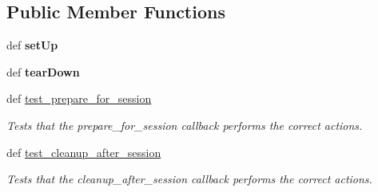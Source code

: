 \subsection*{Public Member Functions}
\begin{DoxyCompactItemize}
\item 
\hypertarget{classhwm_1_1hardware_1_1devices_1_1drivers_1_1mxl__balloon__tracker_1_1tests_1_1test__mxl__ballodf60623d41e11143100d8361dee24ac6_aff128f0ada139a591e12be5211de7720}{def {\bfseries set\-Up}}\label{classhwm_1_1hardware_1_1devices_1_1drivers_1_1mxl__balloon__tracker_1_1tests_1_1test__mxl__ballodf60623d41e11143100d8361dee24ac6_aff128f0ada139a591e12be5211de7720}

\item 
\hypertarget{classhwm_1_1hardware_1_1devices_1_1drivers_1_1mxl__balloon__tracker_1_1tests_1_1test__mxl__ballodf60623d41e11143100d8361dee24ac6_a63ef7ce99d7bfb0de2ec986b15038068}{def {\bfseries tear\-Down}}\label{classhwm_1_1hardware_1_1devices_1_1drivers_1_1mxl__balloon__tracker_1_1tests_1_1test__mxl__ballodf60623d41e11143100d8361dee24ac6_a63ef7ce99d7bfb0de2ec986b15038068}

\item 
def \hyperlink{classhwm_1_1hardware_1_1devices_1_1drivers_1_1mxl__balloon__tracker_1_1tests_1_1test__mxl__ballodf60623d41e11143100d8361dee24ac6_a5de3af07d10144409221add081907623}{test\-\_\-prepare\-\_\-for\-\_\-session}
\begin{DoxyCompactList}\small\item\em Tests that the prepare\-\_\-for\-\_\-session callback performs the correct actions. \end{DoxyCompactList}\item 
def \hyperlink{classhwm_1_1hardware_1_1devices_1_1drivers_1_1mxl__balloon__tracker_1_1tests_1_1test__mxl__ballodf60623d41e11143100d8361dee24ac6_a74753ed8b5e1cf0bf5e2e6150bb69ee0}{test\-\_\-cleanup\-\_\-after\-\_\-session}
\begin{DoxyCompactList}\small\item\em Tests that the cleanup\-\_\-after\-\_\-session callback performs the correct actions. \end{DoxyCompactList}\end{DoxyCompactItemize}

